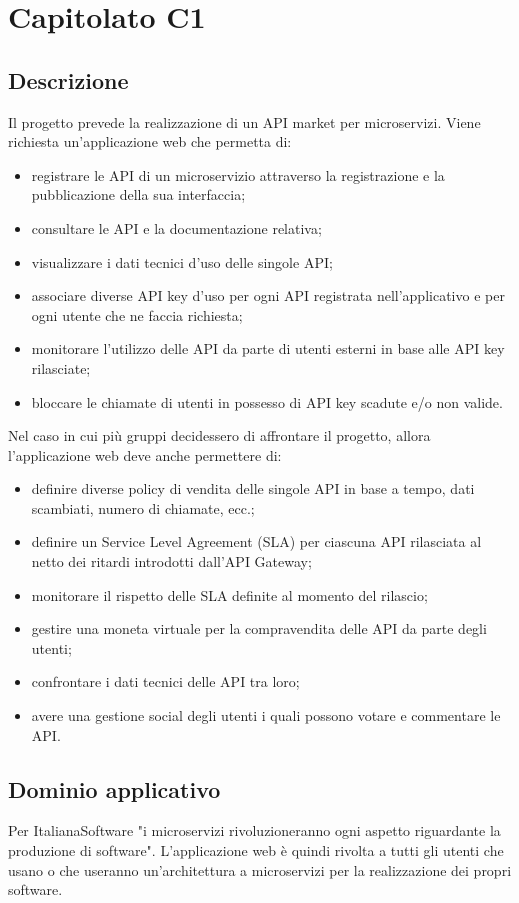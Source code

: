 \section {Capitolato C1}
	\subsection {Descrizione}
		Il progetto prevede la realizzazione di un API market per microservizi. Viene richiesta un'applicazione web che permetta di:
		\begin {itemize}
			\item registrare le API di un microservizio attraverso la registrazione e la pubblicazione della sua interfaccia;
			\item consultare le API e la documentazione relativa;
			\item visualizzare i dati tecnici d'uso delle singole API;
			\item associare diverse API key d'uso per ogni API registrata nell'applicativo e per ogni utente che ne faccia richiesta;
			\item monitorare l'utilizzo delle API da parte di utenti esterni in base alle API key rilasciate;
			\item bloccare le chiamate di utenti in possesso di API key scadute e/o non valide.
		\end {itemize}
		Nel caso in cui più gruppi decidessero di affrontare il progetto, allora l'applicazione web deve anche permettere di:
		\begin {itemize}
			\item definire diverse policy di vendita delle singole API in base a tempo, dati scambiati, numero di chiamate, ecc.;
			\item definire un Service Level Agreement (SLA) per ciascuna API rilasciata al netto dei ritardi introdotti dall'API Gateway;
			\item monitorare il rispetto delle SLA definite al momento del rilascio;
			\item gestire una moneta virtuale per la compravendita delle API da parte degli utenti;
			\item confrontare i dati tecnici delle API tra loro;
			\item avere una gestione social degli utenti i quali possono votare e commentare le API.
		\end {itemize}
	\subsection {Dominio applicativo} 
		Per ItalianaSoftware "i microservizi rivoluzioneranno ogni aspetto riguardante la produzione di software". L'applicazione web è quindi rivolta a tutti gli utenti che usano o che useranno 
		un'architettura a microservizi per la realizzazione dei propri software.
